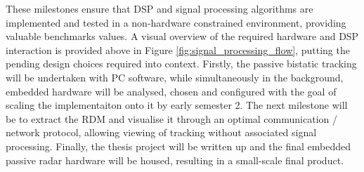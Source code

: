 \documentclass[12pt,a4paper]{article}
\begin{document}
\par \vspace{0.5cm} 
\noindent These milestones ensure that DSP and signal processing algorithms are implemented and tested in a non-hardware constrained environment, providing valuable benchmarks values. A visual overview of the required hardware and DSP interaction is provided above in Figure \ref{fig:signal_processing_flow}, putting the pending design choices required into context. Firstly, the passive bistatic tracking will be undertaken with PC software, while simultaneously in the background, embedded hardware will be analysed, chosen and configured with the goal of scaling the implementaiton onto it by early semester 2. The next milestone will be to extract the RDM and visualise it through an optimal communication / network protocol, allowing viewing of tracking without associated signal processing. Finally, the thesis project will be written up and the final embedded passive radar hardware will be housed, resulting in a small-scale final product.
\end{document}
